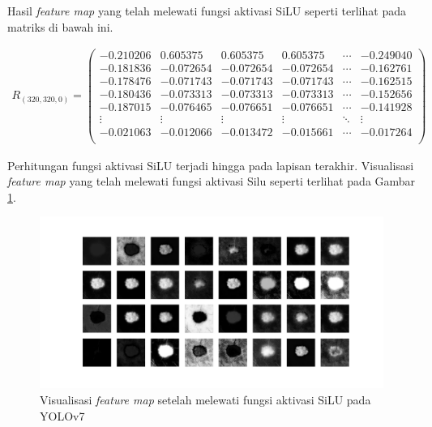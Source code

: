     Hasil \textit{feature map} yang telah melewati fungsi aktivasi SiLU seperti terlihat pada matriks di bawah ini.

    \begin{align*}
        R_{(320, 320, 0)} = 
        \begin{pmatrix}
            -0.210206 & 0.605375  & 0.605375  & 0.605375  & \cdots & -0.249040 \\
            -0.181836 & -0.072654 & -0.072654 & -0.072654 & \cdots & -0.162761 \\
            -0.178476 & -0.071743 & -0.071743 & -0.071743 & \cdots & -0.162515 \\
            -0.180436 & -0.073313 & -0.073313 & -0.073313 & \cdots & -0.152656 \\
            -0.187015 & -0.076465 & -0.076651 & -0.076651 & \cdots & -0.141928 \\
            \vdots    & \vdots    & \vdots    & \vdots    & \ddots & \vdots \\
            -0.021063 & -0.012066 & -0.013472 & -0.015661 & \cdots & -0.017264 \\
        \end{pmatrix}
    \end{align*}

    Perhitungan fungsi aktivasi SiLU terjadi hingga pada lapisan terakhir. Visualisasi \textit{feature map} yang telah melewati fungsi aktivasi Silu seperti terlihat pada Gambar \ref{fig:d-silu}.

    \begin{figure}[H]
        \begin{center}
            \includegraphics[width=12cm]{img/bab4/silu-layer.png}
            \caption{Visualisasi \textit{feature map} setelah melewati fungsi aktivasi SiLU pada YOLOv7}
            \label{fig:d-silu}
        \end{center}
    \end{figure}

